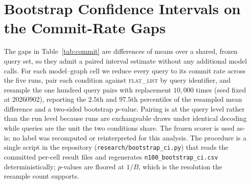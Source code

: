\documentclass[11pt]{article}
\begin{document}
\section{Bootstrap Confidence Intervals on the Commit-Rate Gaps}
\label{app:ci}

The gaps in Table~\ref{tab:commit} are differences of means over a shared,
frozen query set, so they admit a paired interval estimate without any
additional model calls. For each model--graph cell we reduce every query to its
commit rate across the five runs, pair each condition against
\textsc{flat\_list} by query identifier, and resample the one hundred query
pairs with replacement $10{,}000$ times (seed fixed at 20260902), reporting the
$2.5$th and $97.5$th percentiles of the resampled mean difference and a
two-sided bootstrap $p$-value. Pairing is at the query level rather than the run
level because runs are exchangeable draws under identical decoding while queries
are the unit the two conditions share. The frozen scorer is used as-is; no label
was recomputed or reinterpreted for this analysis. The procedure is a single
script in the repository (\texttt{research/bootstrap\_ci.py}) that reads the
committed per-cell result files and regenerates
\texttt{n100\_bootstrap\_ci.csv} deterministically; $p$-values are floored at
$1/B$, which is the resolution the resample count supports.
\end{document}
